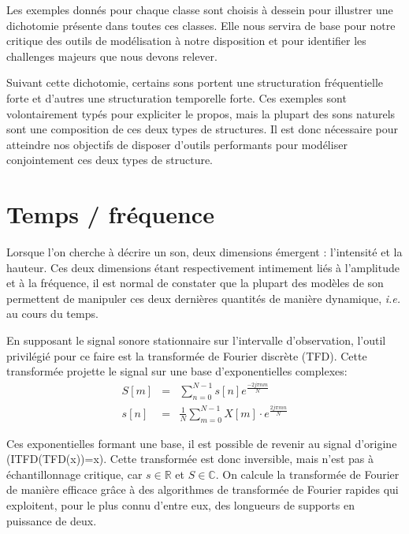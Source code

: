 Les exemples donnés pour chaque classe sont choisis à dessein pour illustrer une dichotomie présente dans toutes ces classes. Elle nous servira de base pour notre critique des outils de modélisation à notre disposition et pour identifier les challenges majeurs que nous devons relever.

Suivant cette dichotomie, certains sons portent une structuration fréquentielle forte et d'autres une structuration temporelle forte. Ces exemples sont volontairement typés pour expliciter le propos, mais la plupart des sons naturels sont une composition de ces deux types de structures. Il est donc nécessaire pour atteindre nos objectifs de disposer d'outils performants pour modéliser conjointement ces deux types de structure.

\section{ \nmu Temps / fréquence} \label{sec:tf}

Lorsque l'on cherche à décrire un son, deux dimensions émergent : l'intensité et la hauteur. Ces deux dimensions étant respectivement intimement liés à l'amplitude et à la fréquence, il est normal de constater que la plupart des modèles de son permettent de manipuler ces deux dernières quantités de manière dynamique, \textit{i.e.} au cours du temps.

En supposant le signal sonore stationnaire sur l'intervalle d'observation, l'outil privilégié pour ce faire est la transformée de Fourier discrète (TFD). Cette transformée projette le signal sur une base d'exponentielles complexes:
\begin{eqnarray}
  S[m] &=& \sum_{n=0}^{N-1} s[n] e^{\frac{-2j \pi nm}{N}} \\
  s[n] &=& \frac{1}{N} \sum_{m=0}^{N-1} X[m] \cdot e^{\frac{ 2 j \pi m n }{N}}
\end{eqnarray}

Ces exponentielles formant une base, il est possible de revenir au signal d'origine (ITFD(TFD(x))=x). Cette transformée est donc inversible, mais n'est pas à échantillonnage critique, car $s\in \mathbb{R}$  et $S \in \mathbb{C}$. On calcule la transformée de Fourier de manière efficace grâce à des algorithmes de transformée de Fourier rapides qui exploitent, pour le plus connu d'entre eux, des longueurs de supports en puissance de deux.

